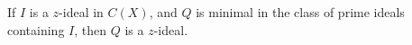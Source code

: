 If $I$ is a $z$-ideal in $C(X)$, and $Q$ is minimal in the class of prime ideals containing $I$, then $Q$ is a $z$-ideal.
